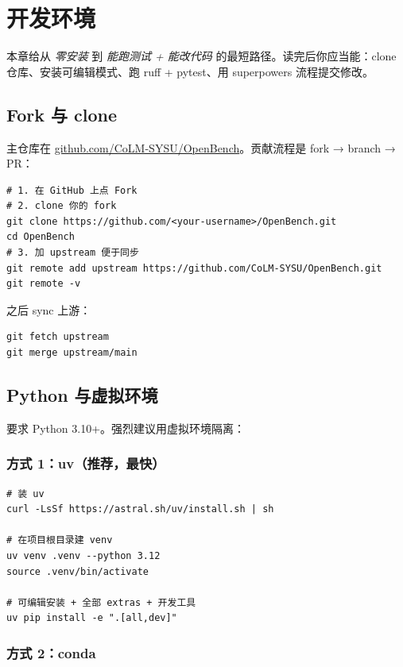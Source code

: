 
\chapter{开发环境}

本章给从 \emph{零安装} 到 \emph{能跑测试 + 能改代码} 的最短路径。读完后你应当能：clone 仓库、安装可编辑模式、跑 ruff + pytest、用 superpowers 流程提交修改。

\section{Fork 与 clone}

\openbench{} 主仓库在 \href{https://github.com/CoLM-SYSU/OpenBench}{github.com/CoLM-SYSU/OpenBench}。贡献流程是 fork → branch → PR：

\begin{verbatim}
# 1. 在 GitHub 上点 Fork
# 2. clone 你的 fork
git clone https://github.com/<your-username>/OpenBench.git
cd OpenBench
# 3. 加 upstream 便于同步
git remote add upstream https://github.com/CoLM-SYSU/OpenBench.git
git remote -v
\end{verbatim}

之后 sync 上游：

\begin{verbatim}
git fetch upstream
git merge upstream/main
\end{verbatim}

\section{Python 与虚拟环境}

\openbench{} 要求 Python 3.10+。强烈建议用虚拟环境隔离：

\subsection{方式 1：uv（推荐，最快）}

\begin{verbatim}
# 装 uv
curl -LsSf https://astral.sh/uv/install.sh | sh

# 在项目根目录建 venv
uv venv .venv --python 3.12
source .venv/bin/activate

# 可编辑安装 + 全部 extras + 开发工具
uv pip install -e ".[all,dev]"
\end{verbatim}

\subsection{方式 2：conda}

